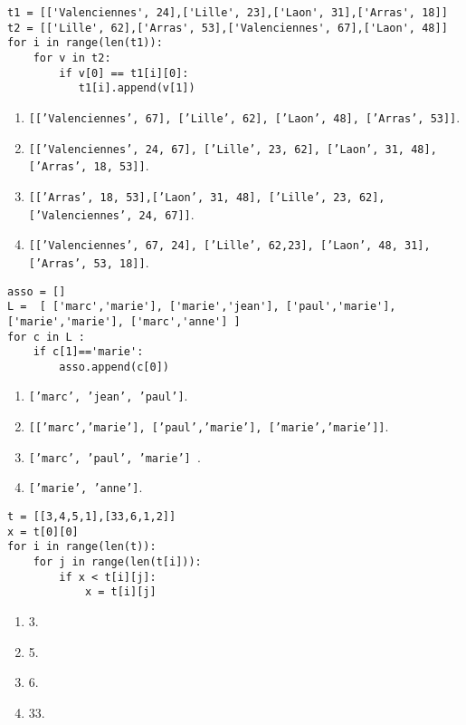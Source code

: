\begin{lstlisting}
t1 = [['Valenciennes', 24],['Lille', 23],['Laon', 31],['Arras', 18]]
t2 = [['Lille', 62],['Arras', 53],['Valenciennes', 67],['Laon', 48]]
for i in range(len(t1)):
    for v in t2:
        if v[0] == t1[i][0]:
           t1[i].append(v[1])
\end{lstlisting}
\begin{enumerate}
\item \texttt{[['Valenciennes', 67], ['Lille', 62], ['Laon', 48], ['Arras', 53]]}.
\item \texttt{[['Valenciennes', 24, 67], ['Lille', 23, 62], ['Laon', 31, 48], ['Arras', 18, 53]]}. %
\item \texttt{[['Arras', 18, 53],['Laon', 31, 48], ['Lille', 23, 62], ['Valenciennes', 24, 67]]}.
\item \texttt{[['Valenciennes', 67, 24], ['Lille', 62,23], ['Laon', 48, 31], ['Arras', 53, 18]]}.
\end{enumerate}

\begin{lstlisting}
asso = []
L =  [ ['marc','marie'], ['marie','jean'], ['paul','marie'], ['marie','marie'], ['marc','anne'] ]
for c in L :
    if c[1]=='marie':
        asso.append(c[0])
\end{lstlisting}
\begin{enumerate}
\item \texttt{['marc', 'jean', 'paul']}.
\item \texttt{[['marc','marie'], ['paul','marie'], ['marie','marie']]}.
\item \texttt{['marc', 'paul', 'marie'] }.%
\item \texttt{['marie', 'anne']}.
\end{enumerate}

\begin{lstlisting}
t = [[3,4,5,1],[33,6,1,2]]
x = t[0][0]
for i in range(len(t)):
    for j in range(len(t[i])):
        if x < t[i][j]:
            x = t[i][j]
\end{lstlisting}
\begin{enumerate}
\item 3.
\item 5.
\item 6.
\item 33. %
\end{enumerate}

\newpage
